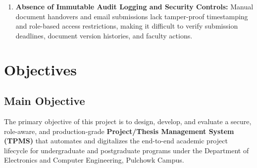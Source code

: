 \begin{enumerate}[label=\textbf{P\arabic*.}]
    \item \textbf{Absence of Immutable Audit Logging and Security Controls:} Manual document handovers and email submissions lack tamper-proof timestamping and role-based access restrictions, making it difficult to verify submission deadlines, document version histories, and faculty actions.
\end{enumerate}

\section{Objectives}

\subsection{Main Objective}
The primary objective of this project is to design, develop, and evaluate a secure, role-aware, and production-grade \textbf{Project/Thesis Management System (TPMS)} that automates and digitalizes the end-to-end academic project lifecycle for undergraduate and postgraduate programs under the Department of Electronics and Computer Engineering, Pulchowk Campus.

